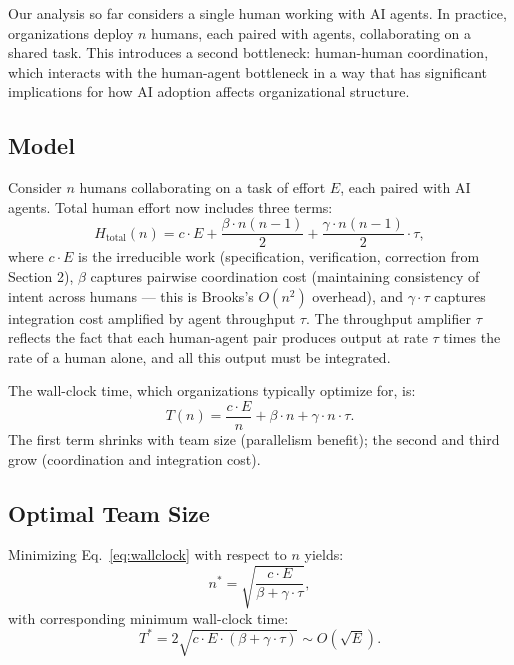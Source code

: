 \documentclass[11pt,a4paper]{article}
\begin{document}
Our analysis so far considers a single human working with AI agents. In practice, organizations deploy $n$ humans, each paired with agents, collaborating on a shared task. This introduces a second bottleneck: human-human coordination, which interacts with the human-agent bottleneck in a way that has significant implications for how AI adoption affects organizational structure.

\subsection{Model}

Consider $n$ humans collaborating on a task of effort $E$, each paired with AI agents. Total human effort now includes three terms:
\begin{equation}
H_{\text{total}}(n) = c \cdot E + \frac{\beta \cdot n(n-1)}{2} + \frac{\gamma \cdot n(n-1)}{2} \cdot \tau,
\end{equation}
where $c \cdot E$ is the irreducible work (specification, verification, correction from Section 2), $\beta$ captures pairwise coordination cost (maintaining consistency of intent across humans --- this is Brooks's $O(n^2)$ overhead), and $\gamma \cdot \tau$ captures integration cost amplified by agent throughput $\tau$. The throughput amplifier $\tau$ reflects the fact that each human-agent pair produces output at rate $\tau$ times the rate of a human alone, and all this output must be integrated.

The wall-clock time, which organizations typically optimize for, is:
\begin{equation}
\label{eq:wallclock}
T(n) = \frac{c \cdot E}{n} + \beta \cdot n + \gamma \cdot n \cdot \tau.
\end{equation}
The first term shrinks with team size (parallelism benefit); the second and third grow (coordination and integration cost).

\subsection{Optimal Team Size}

Minimizing Eq.~\ref{eq:wallclock} with respect to $n$ yields:
\begin{equation}
\label{eq:optimal_n}
n^* = \sqrt{\frac{c \cdot E}{\beta + \gamma \cdot \tau}},
\end{equation}
with corresponding minimum wall-clock time:
\begin{equation}
T^* = 2\sqrt{c \cdot E \cdot (\beta + \gamma \cdot \tau)} \sim O(\sqrt{E}).
\end{equation}
\end{document}
